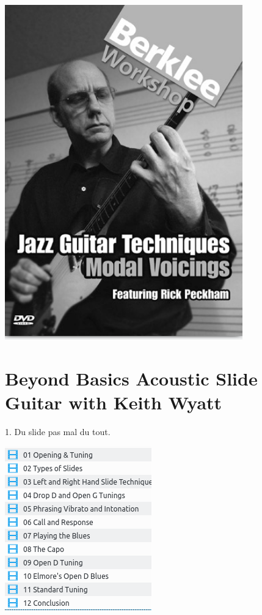 \documentclass[a4paper]{book}
\begin{document}
\begin{center}
\includegraphics[width=10.291cm,height=14.469cm]{lebluessupportsmethodes-img56.png}
\end{center}
\clearpage


\section[Beyond Basics Acoustic Slide Guitar with Keith Wyatt]{Beyond
Basics Acoustic Slide Guitar with Keith Wyatt}
\hypertarget{RefHeadingToc122973218262}{}1. Du slide pas mal du tout.






\begin{center}
\includegraphics[width=6.348cm,height=7.089cm]{lebluessupportsmethodes-img57.png}
\end{center}
\end{document}
